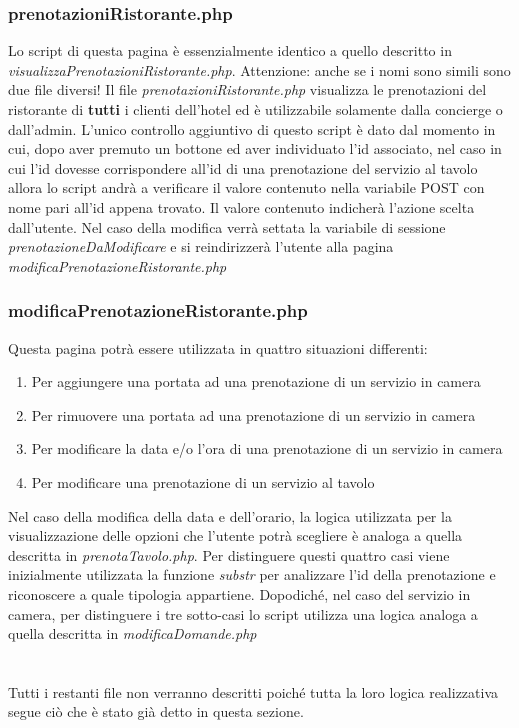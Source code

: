 \documentclass [a4paper, 12pt]{book}
\begin{document}
\subsubsection{prenotazioniRistorante.php}
Lo script di questa pagina è essenzialmente identico a quello descritto in \textit{visualizzaPrenotazioniRistorante.php}. Attenzione: anche se i nomi sono simili sono due file diversi! Il file \textit{prenotazioniRistorante.php} visualizza le prenotazioni del ristorante di \textbf{tutti} i clienti dell'hotel ed è utilizzabile solamente dalla concierge o dall'admin. L'unico controllo aggiuntivo di questo script è dato dal momento in cui, dopo aver premuto un bottone ed aver individuato l'id associato, nel caso in cui l'id dovesse corrispondere all'id di una prenotazione del servizio al tavolo allora lo script andrà a verificare il valore contenuto nella variabile POST con nome pari all'id appena trovato. Il valore contenuto indicherà l'azione scelta dall'utente. Nel caso della modifica verrà settata la variabile di sessione \textit{prenotazioneDaModificare} e si reindirizzerà l'utente alla pagina \textit{modificaPrenotazioneRistorante.php}

\subsubsection{modificaPrenotazioneRistorante.php}
Questa pagina potrà essere utilizzata in quattro situazioni differenti:
\begin{enumerate}
\item Per aggiungere una portata ad una prenotazione di un servizio in camera
\item Per rimuovere una portata ad una prenotazione di un servizio in camera
\item Per modificare la data e/o l'ora di una prenotazione di un servizio in camera
\item Per modificare una prenotazione di un servizio al tavolo
\end{enumerate}
Nel caso della modifica della data e dell'orario, la logica utilizzata per la visualizzazione delle opzioni che l'utente potrà scegliere è analoga a quella descritta in \textit{prenotaTavolo.php}. Per distinguere questi quattro casi viene inizialmente utilizzata la funzione \textit{substr} per analizzare l'id della prenotazione e riconoscere a quale tipologia appartiene. Dopodiché, nel caso del servizio in camera, per distinguere i tre sotto-casi lo script utilizza una logica analoga a quella descritta in \textit{modificaDomande.php}\\\\\\
Tutti i restanti file non verranno descritti poiché tutta la loro logica realizzativa segue ciò che è stato già detto in questa sezione.\newpage
\end{document}
